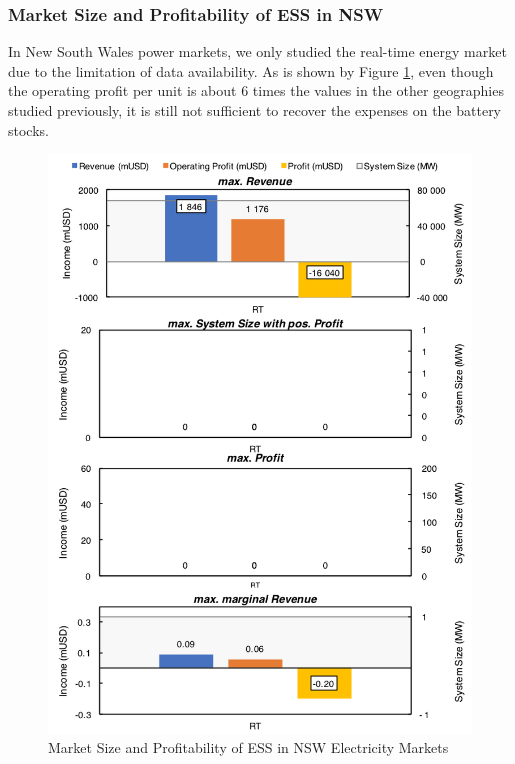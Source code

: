 \subsubsection{Market Size and Profitability of ESS in NSW}
In New South Wales power markets, we only studied the real-time energy market due to the limitation of data availability. As is shown by Figure \ref{fig:nsw-ess}, even though the operating profit per unit is about 6 times the values in the other geographies studied previously, it is still not sufficient to recover the expenses on the battery stocks. 
\begin{figure}[h!]
	\centering
	\includegraphics[width=0.9\linewidth]{Figures/NSW_ESS}
	\caption{Market Size and Profitability of ESS in NSW Electricity Markets}
	\label{fig:nsw-ess}
\end{figure}

